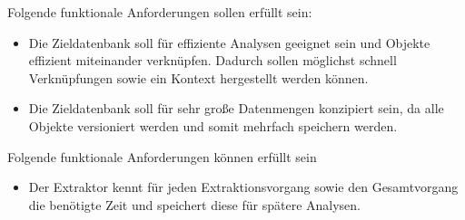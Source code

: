 Folgende funktionale Anforderungen sollen erfüllt sein:
\begin{itemize}
  \item Die Zieldatenbank soll für effiziente Analysen geeignet sein und Objekte effizient miteinander verknüpfen. Dadurch sollen möglichst schnell Verknüpfungen sowie ein Kontext hergestellt werden können.
  \item Die Zieldatenbank soll für sehr große Datenmengen konzipiert sein, da alle Objekte versioniert werden und somit mehrfach speichern werden.
\end{itemize}
Folgende funktionale Anforderungen können erfüllt sein
\begin{itemize}
  \item Der Extraktor kennt für jeden Extraktionsvorgang sowie den Gesamtvorgang die benötigte Zeit und speichert diese für spätere Analysen.
\end{itemize}
